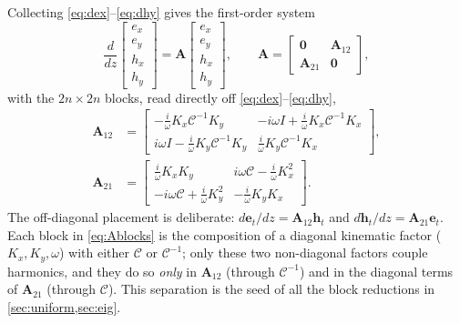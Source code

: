 \documentclass[11pt]{article}
\theoremstyle{remark}
\newcommand{\Cmat}{\mathcal{C}}
\begin{document}
Collecting \eqref{eq:dex}--\eqref{eq:dhy} gives the first-order system
\begin{equation}
\frac{d}{dz}
\begin{bmatrix}e_x\\ e_y\\ h_x\\ h_y\end{bmatrix}
=\mathbf{A}
\begin{bmatrix}e_x\\ e_y\\ h_x\\ h_y\end{bmatrix},\qquad
\mathbf{A}=
\begin{bmatrix}\mathbf{0}&\mathbf{A}_{12}\\
\mathbf{A}_{21}&\mathbf{0}\end{bmatrix},
\label{eq:firstorder}
\end{equation}
with the $2n\times2n$ blocks, read directly off \eqref{eq:dex}--\eqref{eq:dhy},
\begin{align}
\mathbf{A}_{12}&=
\begin{bmatrix}
-\tfrac{i}{\omega}K_x\Cmat^{-1}K_y & -i\omega I+\tfrac{i}{\omega}K_x\Cmat^{-1}K_x\\
i\omega I-\tfrac{i}{\omega}K_y\Cmat^{-1}K_y & \tfrac{i}{\omega}K_y\Cmat^{-1}K_x
\end{bmatrix},\\
\mathbf{A}_{21}&=
\begin{bmatrix}
\tfrac{i}{\omega}K_xK_y & i\omega\Cmat-\tfrac{i}{\omega}K_x^2\\
-i\omega\Cmat+\tfrac{i}{\omega}K_y^2 & -\tfrac{i}{\omega}K_yK_x
\end{bmatrix}.
\label{eq:Ablocks}
\end{align}
The off-diagonal placement is deliberate: $d\mathbf{e}_t/dz=\mathbf{A}_{12}
\mathbf{h}_t$ and $d\mathbf{h}_t/dz=\mathbf{A}_{21}\mathbf{e}_t$.  Each block in
\eqref{eq:Ablocks} is the composition of a diagonal kinematic factor
($K_x,K_y,\omega$) with either $\Cmat$ or $\Cmat^{-1}$; only these two
non-diagonal factors couple harmonics, and they do so \emph{only} in
$\mathbf{A}_{12}$ (through $\Cmat^{-1}$) and in the diagonal terms of
$\mathbf{A}_{21}$ (through $\Cmat$).  This separation is the seed of all the
block reductions in \cref{sec:uniform,sec:eig}.
\end{document}
